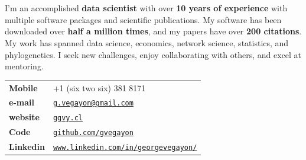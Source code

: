 \documentclass[letterpaper, 10pt]{article}
\newcommand{\myorange}{myteal!70!black}
\newcommand{\darkorange}{\myorange !50!black}
\renewcommand{\bf}{\bfseries\color{\myorange}}
\renewcommand{\textbf}[1]{{\bfseries\color{\myorange}#1}}
\def\name{George G. Vega Yon, Ph.D.}
\begin{document}
	\part*{\color{darkgray}{\name}} 
	
	\vspace{-.25cm}
	\bigskip


	\begin{minipage}{.9\linewidth}
	I'm an accomplished \textbf{data scientist} with over \textbf{10 years of experience} with multiple software packages and scientific publications. My software has been downloaded over \textbf{half a million times}, and my papers have over \textbf{200 citations}. My work has spanned data science, economics, network science, statistics, and phylogenetics. I seek new challenges, enjoy collaborating with others, and excel at mentoring.
	\end{minipage}

	\bigskip



\begin{minipage}{0.50\linewidth}
  \begin{tabular}{>{\bfseries}p{.2\linewidth}p{.79\linewidth}}
    Mobile & +1 (six two six) 381 8171 \\
    e-mail & \href{mailto:g.vegayon@gmail.com}{\tt g.vegayon@gmail.com} \\
    website & \href{https://ggvy.cl}{\tt ggvy.cl} \\
    Code & \href{https://github.com/gvegayon}{\tt github.com/gvegayon}\\
    Linkedin & \href{https://www.linkedin.com/in/georgevegayon/}{\tt www.linkedin.com/in/georgevegayon/} %
  \end{tabular}
\end{minipage}


\section*{\color{\darkorange}{Education}}
\vspace{-.25cm}
\end{document}

